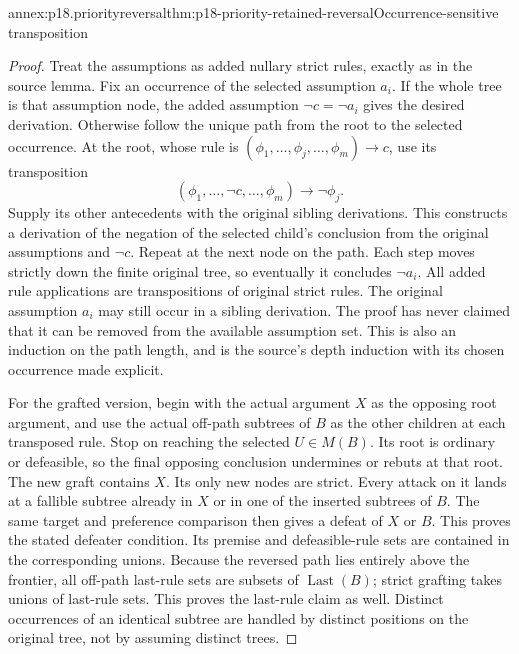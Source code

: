 \begin{annexitem}{annex:p18.priorityreversal}{thm:p18-priority-retained-reversal}{Occurrence-sensitive transposition}
\begin{proof}
Treat the assumptions as added nullary strict rules, exactly as in the
source lemma. Fix an occurrence of the selected assumption \(a_i\).
If the whole tree is that assumption node, the added assumption
\(\neg c=\neg a_i\) gives the desired derivation.
Otherwise follow the unique path from the root to the selected occurrence.
At the root, whose rule is
\((\phi_1,\ldots,\phi_j,\ldots,\phi_m)\to c\), use its transposition
\[
 (\phi_1,\ldots,\neg c,\ldots,\phi_m)\to\neg\phi_j .
\]
Supply its other antecedents with the original sibling derivations.
This constructs a derivation of the negation of the selected child's
conclusion from the original assumptions and \(\neg c\).
Repeat at the next node on the path. Each step moves strictly down
the finite original tree, so eventually it concludes \(\neg a_i\).
All added rule applications are transpositions of original strict rules.
The original assumption \(a_i\) may still occur in a sibling derivation.
The proof has never claimed that it can be removed from the available
assumption set. This is also an induction on the path length, and
is the source's depth induction with its chosen occurrence made explicit.

For the grafted version, begin with the actual argument \(X\) as the
opposing root argument, and use the actual off-path subtrees of \(B\)
as the other children at each transposed rule. Stop on reaching
the selected \(U\in M(B)\). Its root is ordinary or defeasible, so
the final opposing conclusion undermines or rebuts at that root.
The new graft contains \(X\). Its only new nodes are strict.
Every attack on it lands at a fallible subtree already in \(X\)
or in one of the inserted subtrees of \(B\). The same target and
preference comparison then gives a defeat of \(X\) or \(B\).
This proves the stated defeater condition.
Its premise and defeasible-rule sets are contained in the corresponding
unions. Because the reversed path lies entirely above the frontier,
all off-path last-rule sets are subsets of \(\operatorname{Last}(B)\);
strict grafting takes unions of last-rule sets. This proves the last-rule
claim as well. Distinct occurrences of an identical subtree are handled
by distinct positions on the original tree, not by assuming distinct trees.
\end{proof}
\end{annexitem}

